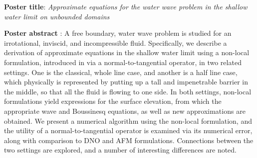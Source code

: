 \documentclass[10pt,reqno,oneside,a4paper]{article}
\author{Sultan Aitzhan}
\date{\today}
\begin{document}
\thispagestyle{fancy}

\textbf{Poster title}: \textit{Approximate equations for the water wave problem in the shallow water limit on unbounded domains}

\textbf{Poster abstract} : A free boundary, water wave problem is studied for an irrotational, inviscid, and incompressible fluid. Specifically, we describe a derivation of approximate equations in the shallow water limit using a non-local formulation, introduced in \cite{KV2013} via a normal-to-tangential operator, in two related settings. One is the classical, whole line case, and another is a half line case, which physically is represented by putting up a tall and impenetrable barrier in the middle, so that all the fluid is flowing to one side. In both settings, non-local formulations yield expressions for the surface elevation, from which the appropriate wave and Boussinesq equations, as well as new approximations are obtained. We present a numerical algorithm using the non-local formulation, and the utility of a normal-to-tangential operator is examined via its numerical error, along with comparison to DNO \cite{DNO} and AFM \cite{AFM} formulations. Connections between the two settings are explored, and a number of interesting differences are noted.


{\small}
\end{document}
